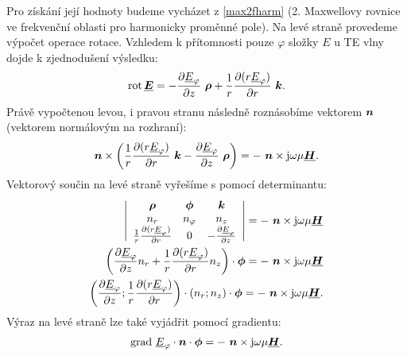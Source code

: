 \documentclass[12pt,a4paper,oneside]{article}
\numberwithin{equation}{section} %
\numberwithin{figure}{section} %
\numberwithin{table}{section} %
\newcommand{\mj}{\mathrm{j}} %
\renewcommand{\vec}[1]{\mbox{\boldmath$#1$}} %
\newcommand{\faz}[1]{{\underline{#1}}} %
\newcommand{\grad}{\mathrm{grad}\ }
\newcommand{\rot}{\mathrm{rot}\ }
\begin{document}
Pro získání její hodnoty budeme vycházet z \ref{max2fharm} (2. Maxwellovy rovnice ve frekvenční oblasti pro harmonicky proměnné pole). Na levé straně provedeme výpočet operace rotace. Vzhledem k přítomnosti pouze $\varphi$ složky $E$ u TE vlny dojde k zjednodušení výsledku:
\begin{equation}
\rot \! \faz{\vec{E}} = - \frac{\partial \faz{E} _{\varphi}}{\partial z} ~ \vec{\rho} + \frac{1}{r} \frac{\partial ( r \faz{E} _{\varphi} ) }{\partial r} ~ \vec{k} .
\end{equation}
Právě vypočtenou levou, i pravou stranu následně roznásobíme vektorem $\vec{n}$ (vektorem normálovým na rozhraní):
\begin{equation}
\vec{n} \times \left( \frac{1}{r} \frac{\partial ( r \faz{E} _{\varphi} ) }{\partial r} ~ \vec{k} - \frac{\partial \faz{E}_{\varphi}}{\partial z} ~ \vec{\rho} \right) = - ~ \vec{n} \times \mj \omega \mu \faz{\vec{H}} .
\end{equation}
Vektorový součin na levé straně vyřešíme s pomocí determinantu:
\begin{subequations}
\begin{align}
\left| 
\begin{array}{c c c}
\vec{\rho} & \vec{\phi} & \vec{k} \\ 
n_r & n_{\varphi} & n_z \\
\frac{1}{r} \frac{\partial ( r \faz{E} _{\varphi} ) }{\partial r} & 0 & - \frac{\partial \faz{E} _{\varphi}}{\partial z}
\end{array}
\right|
= - ~ \vec{n} \times \mj \omega \mu \faz{\vec{H}} 
\\
\left( \frac{\partial \faz{E}_{\varphi}}{\partial z} n_{r} + \frac{1}{r} \frac{\partial ( r \faz{E} _{\varphi} ) }{\partial r} n_z \right) \cdot \vec{\phi} = - ~ \vec{n} \times \mj \omega \mu \faz{\vec{H}}
\\
\left( \frac{\partial \faz{E} _{\varphi}}{\partial z} ;\frac{1}{r} \frac{\partial ( r \faz{E} _{\varphi} ) }{\partial r} \right) \cdot \left( n_r; n_{z} \right) \cdot \vec{\phi} = - ~ \vec{n} \times \mj \omega \mu \faz{\vec{H}} .
\end{align}
\end{subequations}
Výraz na levé straně lze také vyjádřit pomocí gradientu:
\begin{equation}
\grad \faz{E} _{\varphi} \cdot \vec{n} \cdot \vec{\phi} = - ~ \vec{n} \times \mj \omega \mu \faz{\vec{H}} .
\end{equation}
\end{document}

